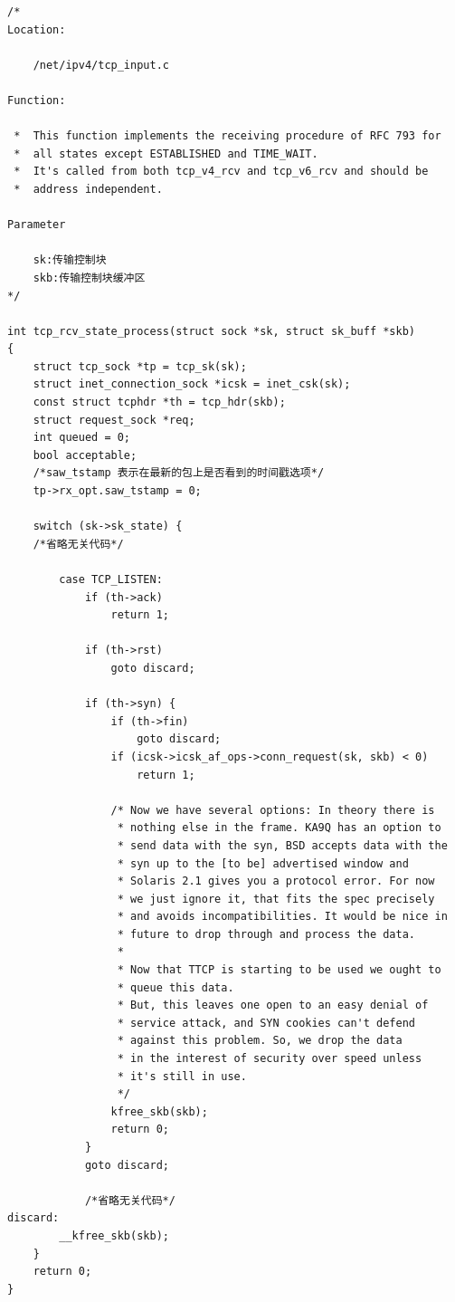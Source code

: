 \begin{verbatim}
/*
Location:
	
	/net/ipv4/tcp_input.c

Function:

 *  This function implements the receiving procedure of RFC 793 for
 *  all states except ESTABLISHED and TIME_WAIT.
 *  It's called from both tcp_v4_rcv and tcp_v6_rcv and should be
 *  address independent.	

Parameter

	sk:传输控制块
	skb:传输控制块缓冲区
*/

int tcp_rcv_state_process(struct sock *sk, struct sk_buff *skb)
{
    struct tcp_sock *tp = tcp_sk(sk);
    struct inet_connection_sock *icsk = inet_csk(sk);
    const struct tcphdr *th = tcp_hdr(skb);
    struct request_sock *req;
    int queued = 0;
    bool acceptable;
	/*saw_tstamp 表示在最新的包上是否看到的时间戳选项*/
    tp->rx_opt.saw_tstamp = 0;  

    switch (sk->sk_state) {
    /*省略无关代码*/

        case TCP_LISTEN:
            if (th->ack)
                return 1;

            if (th->rst)
                goto discard;

            if (th->syn) {
                if (th->fin)
                    goto discard;
                if (icsk->icsk_af_ops->conn_request(sk, skb) < 0)
                    return 1;

                /* Now we have several options: In theory there is
                 * nothing else in the frame. KA9Q has an option to
                 * send data with the syn, BSD accepts data with the
                 * syn up to the [to be] advertised window and
                 * Solaris 2.1 gives you a protocol error. For now
                 * we just ignore it, that fits the spec precisely
                 * and avoids incompatibilities. It would be nice in
                 * future to drop through and process the data.
                 *
                 * Now that TTCP is starting to be used we ought to
                 * queue this data.
                 * But, this leaves one open to an easy denial of
                 * service attack, and SYN cookies can't defend
                 * against this problem. So, we drop the data
                 * in the interest of security over speed unless
                 * it's still in use.
                 */
                kfree_skb(skb);
                return 0;
            }
            goto discard;

            /*省略无关代码*/
discard:
        __kfree_skb(skb);
    }
    return 0;
}
\end{verbatim}

